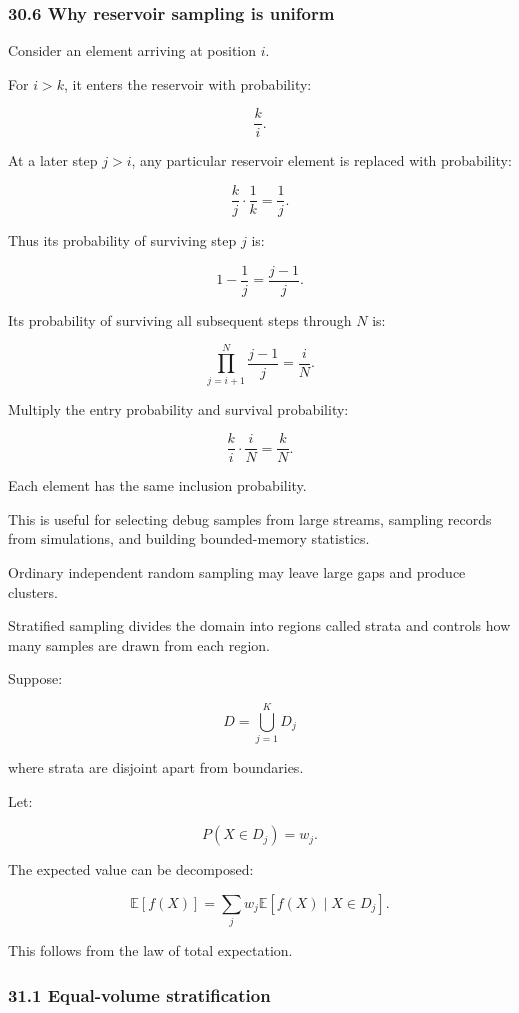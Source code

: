 \subsubsection{30.6 Why reservoir sampling is uniform}\label{why-reservoir-sampling-is-uniform}

Consider an element arriving at position \(i\).

For \(i>k\), it enters the reservoir with probability:

\[ \frac{k}{i}. \]

At a later step \(j>i\), any particular reservoir element is replaced with probability:

\[ \frac{k}{j}\cdot\frac1k=\frac1j. \]

Thus its probability of surviving step \(j\) is:

\[ 1-\frac1j=\frac{j-1}{j}. \]

Its probability of surviving all subsequent steps through \(N\) is:

\[ \prod_{j=i+1}^{N}\frac{j-1}{j} = \frac iN. \]

Multiply the entry probability and survival probability:

\[ \frac ki\cdot\frac iN = \boxed{\frac kN}. \]

Each element has the same inclusion probability.

This is useful for selecting debug samples from large streams, sampling records from simulations, and building bounded-memory statistics.

Ordinary independent random sampling may leave large gaps and produce clusters.

Stratified sampling divides the domain into regions called strata and controls how many samples are drawn from each region.

Suppose:

\[ D=\bigcup_{j=1}^{K}D_j \]

where strata are disjoint apart from boundaries.

Let:

\[ P(X\in D_j)=w_j. \]

The expected value can be decomposed:

\[ \mathbb E[f(X)] = \sum_jw_j\mathbb E[f(X)\mid X\in D_j]. \]

This follows from the law of total expectation.

\subsubsection{31.1 Equal-volume stratification}\label{equal-volume-stratification}

